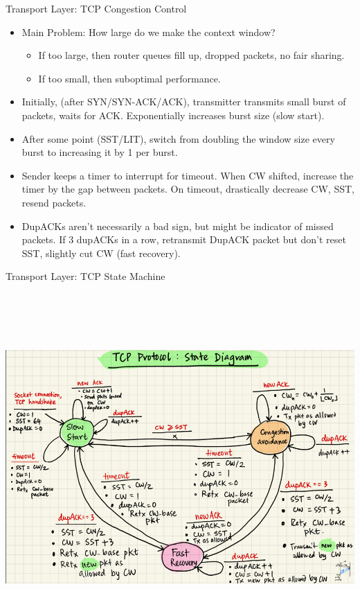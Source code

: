 \documentclass{beamer}
\begin{document}
\begin{frame}[t]{Transport Layer: TCP Congestion Control}
    \begin{itemize}
        \item \alert{Main Problem}: How large do we make the context window?
        \begin{itemize}
            \item If too large, then router queues fill up, dropped packets, no fair sharing.
            \item If too small, then suboptimal performance.
        \end{itemize}
        \item \pause Initially, (after SYN/SYN-ACK/ACK), transmitter transmits small burst of packets, waits for ACK. Exponentially increases burst size (\alert{slow start}).
        \item \pause After some point (\alert{SST}/\alert{LIT}), switch from doubling the window size every burst to increasing it by 1 per burst.
        \item \pause Sender keeps a timer to interrupt for timeout. When CW shifted, increase the timer by the gap between packets. On timeout, drastically decrease CW, SST, resend packets.
        \item \pause DupACKs aren't necessarily a bad sign, but might be indicator of missed packets. If 3 dupACKs in a row, retransmit DupACK packet but don't reset SST, slightly cut CW (\alert{fast recovery}).
    \end{itemize}
\end{frame}

\begin{frame}[t]{Transport Layer: TCP State Machine}
    \includegraphics[height=14cm]{tcp flowchart.png}
\end{frame}
\end{document}
